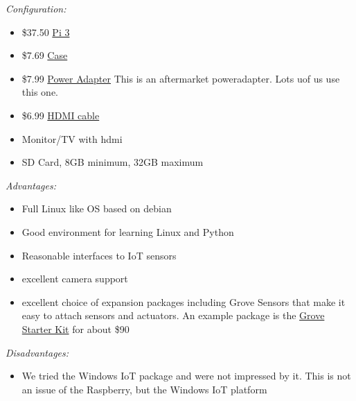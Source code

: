 \emph{Configuration:}

\begin{itemize}
\tightlist
\item
  \$37.50
  \href{https://www.amazon.com/Raspberry-Model-A1-2GHz-64-bit-quad-core/dp/B01CD5VC92/ref=sr_1_1?s=pc\&ie=UTF8\&qid=1499251061\&sr=1-1\&keywords=raspberry+pi+3}{Pi
  3}
\item
  \$7.69
  \href{https://www.amazon.com/Eleduino-Raspberry-Model-Acrylic-Enclosure/dp/B01CQRROLW/ref=sr_1_7?s=electronics\&ie=UTF8\&qid=1499251106\&sr=1-7\&keywords=raspberry+pi+3+case}{Case}
\item
  \$7.99
  \href{https://www.amazon.com/Enokay-Supply-Raspberry-Charger-Adapter/dp/B01MZX466R/ref=sr_1_3?ie=UTF8\&qid=1498443576\&sr=8-3\&keywords=raspberry+pi+power+adapter+micro+usb+switch}{Power
  Adapter} This is an aftermarket poweradapter. Lots uof us use this
  one.
\item
  \$6.99
  \href{https://www.amazon.com/AmazonBasics-High-Speed-HDMI-Cable-Standard/dp/B014I8SSD0/ref=sr_1_3?ie=UTF8\&qid=1499253502\&sr=8-3\&keywords=hdmi+cable}{HDMI
  cable}
\item
  Monitor/TV with hdmi
\item
  SD Card, 8GB minimum, 32GB maximum
\end{itemize}

\emph{Advantages:}

\begin{itemize}
\tightlist
\item
  Full Linux like OS based on debian
\item
  Good environment for learning Linux and Python
\item
  Reasonable interfaces to IoT sensors
\item
  excellent camera support
\item
  excellent choice of expansion packages including Grove Sensors that
  make it easy to attach sensors and actuators. An example package is
  the
  \href{https://www.amazon.com/GrovePi-Starter-Kit-Dexter-Industries/dp/B00TXTZ5SQ/ref=pd_lpo_vtph_147_bs_tr_img_1?_encoding=UTF8\&psc=1\&refRID=45QX6XSNZAG1NT8NES79}{Grove
  Starter Kit} for about \$90
\end{itemize}

\emph{Disadvantages:}

\begin{itemize}
\tightlist
\item
  We tried the Windows IoT package and were not impressed by it. This is
  not an issue of the Raspberry, but the Windows IoT platform
\end{itemize}

